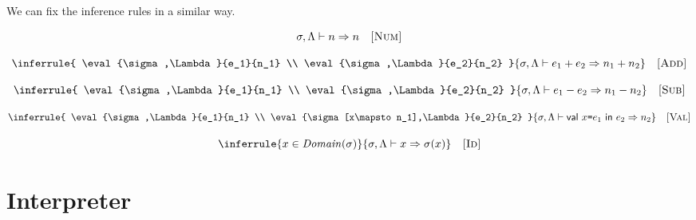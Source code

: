 
\vspace{-1em}


\vspace{-1em}


\vspace{-1em}


\vspace{-1em}


We can fix the inference rules in a similar way.

\[
  \sigma,\Lambda\vdash n\Rightarrow n
  \quad\textsc{[Num]}
\]

\[
  \inferrule
  {
    \eval{\sigma,\Lambda}{e_1}{n_1} \\
    \eval{\sigma,\Lambda}{e_2}{n_2}
  }
  { \eval{\sigma,\Lambda}{\eadd{e_1}{e_2}}{n_1+n_2} }
  \quad\textsc{[Add]}
\]

\[
  \inferrule
  {
    \eval{\sigma,\Lambda}{e_1}{n_1} \\
    \eval{\sigma,\Lambda}{e_2}{n_2}
  }
  { \eval{\sigma,\Lambda}{\esub{e_1}{e_2}}{n_1-n_2} }
  \quad\textsc{[Sub]}
\]

\[
  \inferrule
  {
    \eval{\sigma,\Lambda}{e_1}{n_1} \\
    \eval{\sigma[x\mapsto n_1],\Lambda}{e_2}{n_2}
  }
  { \eval{\sigma,\Lambda}{\ebind{x}{e_1}{e_2}}{n_2} }
  \quad\textsc{[Val]}
\]

\[
  \inferrule
  { x\in\dom{\sigma} }
  { \eval{\sigma,\Lambda}{x}{\sigma(x)} }
  \quad\textsc{[Id]}
\]

\section{Interpreter}

